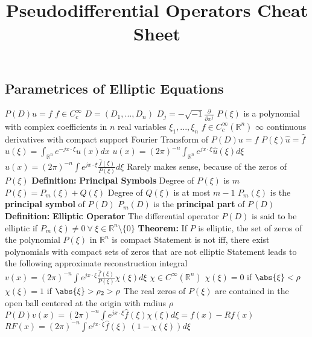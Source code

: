 \documentclass[14pt]{extarticle}
\title{Pseudodifferential Operators Cheat Sheet}
\def\Definition{{\color{blue} \textbf{Definition:} }}
\def\Theorem{{\color{red} \textbf{Theorem:} }}
\begin{document}
\maketitle

\begin{outline}		
	\section*{Parametrices of Elliptic Equations}
		\1	$P(D)u = f$
			\2	$f \in C_c^{\infty}$ 
			\2	$D = (D_1,...,D_n)$
			\2	$D_j = -\sqrt{-1} \frac{\partial}{\partial x^j}$
			\2	$P(\xi)$ is a polynomial with complex coefficients in $n$ real variables
					$\xi_1,...,\xi_n$
			\2	$f \in C_c^{\infty}(\mathbb{R}^n)$ 
				\3	$\infty$ continuous derivatives with compact support
		\1	Fourier Transform of $P(D)u = f$
			\2	$P(\xi)\hat{u} = \hat{f}$
			\2	$\hat{u}(\xi) = \int_{\mathbb{R}^n} e^{-jx \cdot \xi}u(x)dx$
			\2	$u(x) = (2\pi)^{-n} \int_{\mathbb{R}^n} e^{jx \cdot \xi}\hat{u}(\xi)d\xi$
			\2	$u(x) = (2\pi)^{-n} \int e^{jx \cdot \xi} \frac{\hat{f}(\xi)}{P(\xi)}d\xi$
				\3	Rarely makes sense, because of the zeros of $P(\xi)$
		\1	\Definition	\textbf{Principal Symbols}
			\2	Degree of $P(\xi)$ is $m$
			\2	$P(\xi) = P_m(\xi) + Q(\xi)$
				\3	Degree of $Q(\xi)$ is at most $m-1$
			\2	$P_m(\xi)$ is the \textbf{principal symbol} of $P(D)$
			\2	$P_m(D)$ is the \textbf{principal part} of $P(D)$
		\1	\Definition \textbf{Elliptic Operator}
			\2	The differential operator $P(D)$ is said to be elliptic
					if $P_m(\xi) \ne 0~\forall~\xi \in \mathbb{R}^n\setminus \{0\}$
		\1	\Theorem If $P$ is elliptic, the set of zeros of the polynomial 
				$P(\xi)$ in $\mathbb{R}^n$ is compact
			\2	Statement is not iff, there exist polynomials with compact sets of
					zeros that are not elliptic
			\2	Statement leads to the following approximate reconstruction integral
					$v(x) = (2\pi)^{-n} \int e^{jx \cdot \xi} \frac{\hat{f}(\xi)}{P(\xi)}\chi(\xi)d\xi$
				\3	$\chi \in C^{\infty}(\mathbb{R}^n)$
				\3	$\chi(\xi) = 0$ if $\abs{\xi} < \rho$
				\3	$\chi(\xi) = 1$ if $\abs{\xi} > \rho_2 > \rho$
				\3	The real zeros of $P(\xi)$ are contained in the open ball centered
						at the origin with radius $\rho$
			\2	$P(D)v(x) = (2\pi)^{-n} \int e^{jx \cdot \xi} \hat{f}(\xi)\chi(\xi)d\xi = f(x) - Rf(x)$
			\2	$RF(x) = (2\pi)^{-n}\int e^{jx \cdot \xi}\hat{f}(\xi)~(1 - \chi(\xi))d\xi$

\end{outline}
\end{document}
